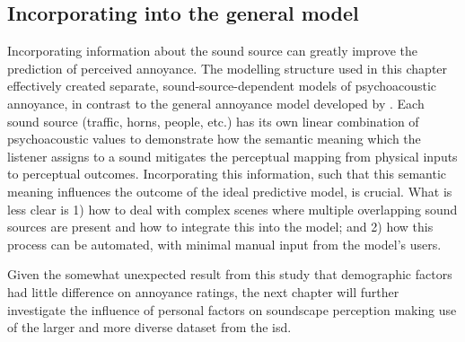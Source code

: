 \subsection{Incorporating into the general model}
Incorporating information about the sound source can greatly improve the prediction of perceived annoyance. The modelling structure used in this chapter effectively created separate, sound-source-dependent models of psychoacoustic annoyance, in contrast to the general annoyance model developed by \citet{PsychoacousticsfactsmodelsZwicker}. Each sound source (traffic, horns, people, etc.) has its own linear combination of psychoacoustic values to demonstrate how the semantic meaning which the listener assigns to a sound mitigates the perceptual mapping from physical inputs to perceptual outcomes. Incorporating this information, such that this semantic meaning influences the outcome of the ideal predictive model, is crucial. What is less clear is 1) how to deal with complex scenes where multiple overlapping sound sources are present and how to integrate this into the model; and 2) how this process can be automated, with minimal manual input from the model's users. %

Given the somewhat unexpected result from this study that demographic factors had little difference on annoyance ratings, the next chapter will further investigate the influence of personal factors on soundscape perception making use of the larger and more diverse dataset from the \gls{isd}.